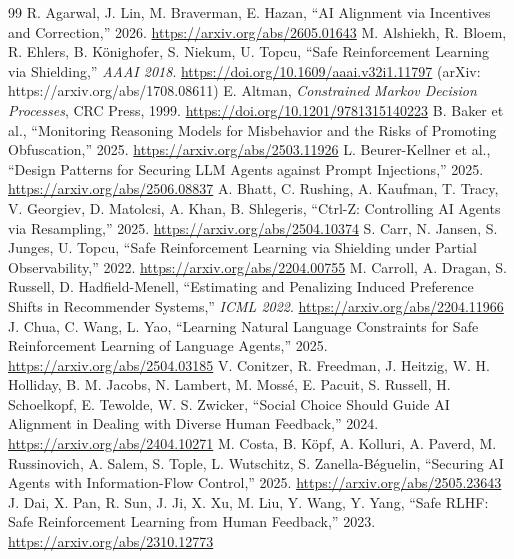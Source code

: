 \documentclass{article}
\begin{document}
\begin{thebibliography}{99}
\small
{} R. Agarwal, J. Lin, M. Braverman, E. Hazan, ``AI Alignment via Incentives and Correction,'' 2026. \url{https://arxiv.org/abs/2605.01643}
 M. Alshiekh, R. Bloem, R. Ehlers, B. Könighofer, S. Niekum, U. Topcu, ``Safe Reinforcement Learning via Shielding,'' \emph{AAAI 2018}. \url{https://doi.org/10.1609/aaai.v32i1.11797} (arXiv: https://arxiv.org/abs/1708.08611)
 E. Altman, \emph{Constrained Markov Decision Processes}, CRC Press, 1999. \url{https://doi.org/10.1201/9781315140223}
 B. Baker et al., ``Monitoring Reasoning Models for Misbehavior and the Risks of Promoting Obfuscation,'' 2025. \url{https://arxiv.org/abs/2503.11926}
 L. Beurer-Kellner et al., ``Design Patterns for Securing LLM Agents against Prompt Injections,'' 2025. \url{https://arxiv.org/abs/2506.08837}
 A. Bhatt, C. Rushing, A. Kaufman, T. Tracy, V. Georgiev, D. Matolcsi, A. Khan, B. Shlegeris, ``Ctrl-Z: Controlling AI Agents via Resampling,'' 2025. \url{https://arxiv.org/abs/2504.10374}
 S. Carr, N. Jansen, S. Junges, U. Topcu, ``Safe Reinforcement Learning via Shielding under Partial Observability,'' 2022. \url{https://arxiv.org/abs/2204.00755}
 M. Carroll, A. Dragan, S. Russell, D. Hadfield-Menell, ``Estimating and Penalizing Induced Preference Shifts in Recommender Systems,'' \emph{ICML 2022}. \url{https://arxiv.org/abs/2204.11966}
 J. Chua, C. Wang, L. Yao, ``Learning Natural Language Constraints for Safe Reinforcement Learning of Language Agents,'' 2025. \url{https://arxiv.org/abs/2504.03185}
 V. Conitzer, R. Freedman, J. Heitzig, W. H. Holliday, B. M. Jacobs, N. Lambert, M. Mossé, E. Pacuit, S. Russell, H. Schoelkopf, E. Tewolde, W. S. Zwicker, ``Social Choice Should Guide AI Alignment in Dealing with Diverse Human Feedback,'' 2024. \url{https://arxiv.org/abs/2404.10271}
 M. Costa, B. Köpf, A. Kolluri, A. Paverd, M. Russinovich, A. Salem, S. Tople, L. Wutschitz, S. Zanella-Béguelin, ``Securing AI Agents with Information-Flow Control,'' 2025. \url{https://arxiv.org/abs/2505.23643}
 J. Dai, X. Pan, R. Sun, J. Ji, X. Xu, M. Liu, Y. Wang, Y. Yang, ``Safe RLHF: Safe Reinforcement Learning from Human Feedback,'' 2023. \url{https://arxiv.org/abs/2310.12773}

\end{thebibliography}
\end{document}
